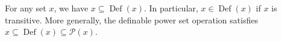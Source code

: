 For any set $x$, we have $x \subseteq \operatorname{Def}(x)$. In particular, $x \in \operatorname{Def}(x)$ if $x$ is transitive. More generally, the definable power set operation satisfies $x \subseteq \operatorname{Def}(x) \subseteq \mathcal{P}(x)$.
